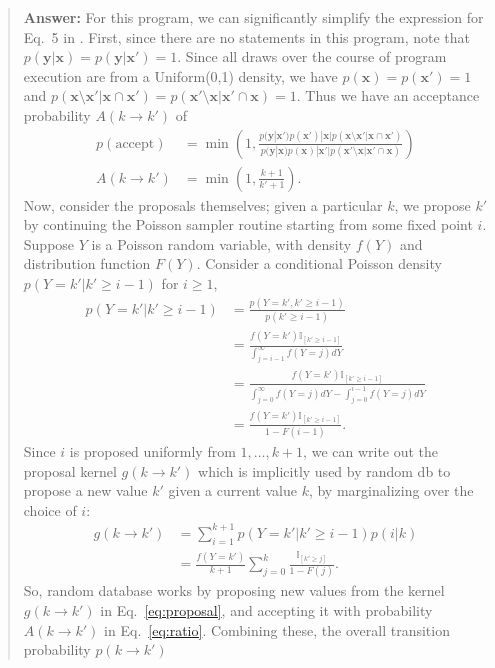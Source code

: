 \documentclass[11pt,reqno]{amsart}
\newif\ifanswers
\newcommand{\+}[1]{\ensuremath{{\mathbf{#1}}}}
\begin{document}
\ifanswers
\begin{quotation}
{\bf Answer: }
For this program, we can significantly simplify the expression for Eq.~5 in \cite{Wood-AISTATS-2014}.
First, since there are no  statements in this program, note that $p(\+y|\+x) = p(\+y|\+x') = 1$. 
Since all draws over the course of program execution are from a Uniform(0,1) density, we have $p(\+x) = p(\+x') = 1$ and
$p(\+x\setminus\+x'|\+x\cap\+x') = p(\+x'\setminus\+x|\+x'\cap\+x) = 1$.
Thus we have an acceptance probability $A(k \rightarrow k')$ of
\begin{align}
p(\mathrm{accept}) &= \min \left ( 1, 
\frac{ p(\+y|\+x') p(\+x') |\+x| p(\+x\setminus\+x'|\+x\cap\+x') }{p(\+y|\+x) p(\+x) |\+x'| p(\+x'\setminus\+x|\+x'\cap\+x) } 
\right ) \\
A(k \rightarrow k') &= \min \left ( 1, \frac{k+1}{k'+1} \right ).
\label{eq:ratio}
\end{align}
Now, consider the proposals themselves; given a particular $k$, we propose $k'$ by continuing the Poisson sampler routine starting from some fixed point $i$.
Suppose $Y$ is a Poisson random variable, with density $f(Y)$ and distribution function $F(Y)$.
Consider a conditional Poisson density $p(Y=k' | k' \ge i-1)$ for $i \ge 1$,
\begin{align}
p(Y=k' | k' \ge i-1) &= \frac{p(Y=k', k' \ge i-1)}{p(k' \ge i-1)}
\\
&=
\frac{f(Y=k')\mathbb{I}_{[k' \ge i-1]}}{\int_{j = i-1}^\infty f(Y=j) dY}
\\
&=
\frac{f(Y=k')\mathbb{I}_{[k' \ge i-1]}}{\int_{j = 0}^\infty f(Y=j) dY - \int_{j = 0}^{i-1} f(Y=j) dY}
\\
&=
\frac{f(Y=k')\mathbb{I}_{[k' \ge i-1]}}{1 - F(i-1)}.
\end{align}
Since $i$ is proposed uniformly from $1, \dots, k+1$, we can write out the proposal kernel $g(k \rightarrow k')$ which is implicitly used by random db to propose a new value $k'$ given a current value $k$, by marginalizing over the choice of $i$:
\begin{align}
g(k \rightarrow  k') &= \sum_{i=1}^{k+1} p(Y=k' | k' \ge i-1)p(i | k) \\
&= \frac{f(Y=k')}{k+1} \sum_{j=0}^{k} \frac{\mathbb{I}_{[k' \ge j]}}{1 - F(j)}.
\label{eq:proposal}
\end{align}
So, random database works by proposing new values from the kernel $g(k \rightarrow k')$ in Eq.~\ref{eq:proposal}, and accepting it with probability $A(k \rightarrow k')$ in Eq.~\ref{eq:ratio}.
Combining these, the overall transition probability $p(k \rightarrow k')$

\end{quotation}
\end{document}
